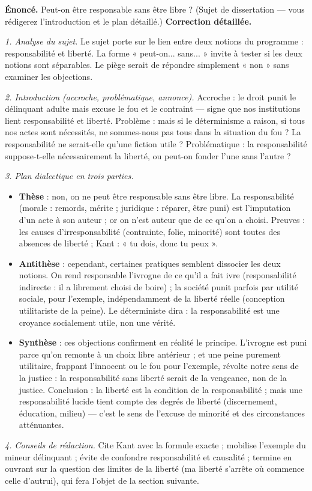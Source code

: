 \documentclass[11pt]{article}
\newcommand{\cle}[1]{{\popxbold\color{popdark}#1}}
\begin{document}
\begin{exoresolu}
\textbf{Énoncé.} Peut-on être responsable sans être libre ? (Sujet de dissertation — vous rédigerez l'introduction et le plan détaillé.)
\tcblower
\textbf{Correction détaillée.}

\emph{1. Analyse du sujet.} Le sujet porte sur le lien entre deux notions du programme : \cle{responsabilité} et \cle{liberté}. La forme « peut-on... sans... » invite à tester si les deux notions sont séparables. Le piège serait de répondre simplement « non » sans examiner les objections.

\emph{2. Introduction (accroche, problématique, annonce).} Accroche : le droit punit le délinquant adulte mais excuse le fou et le contraint — signe que nos institutions lient responsabilité et liberté. Problème : mais si le déterminisme a raison, si tous nos actes sont nécessités, ne sommes-nous pas tous dans la situation du fou ? La responsabilité ne serait-elle qu'une fiction utile ? Problématique : la responsabilité suppose-t-elle nécessairement la liberté, ou peut-on fonder l'une sans l'autre ?

\emph{3. Plan dialectique en trois parties.}
\begin{itemize}
\item \textbf{Thèse} : non, on ne peut être responsable sans être libre. La responsabilité (morale : remords, mérite ; juridique : réparer, être puni) est l'imputation d'un acte à son auteur ; or on n'est auteur que de ce qu'on a choisi. Preuves : les causes d'irresponsabilité (contrainte, folie, minorité) sont toutes des absences de liberté ; Kant : « tu dois, donc tu peux ».
\item \textbf{Antithèse} : cependant, certaines pratiques semblent dissocier les deux notions. On rend responsable l'ivrogne de ce qu'il a fait ivre (responsabilité indirecte : il a librement choisi de boire) ; la société punit parfois par utilité sociale, pour l'exemple, indépendamment de la liberté réelle (conception utilitariste de la peine). Le déterministe dira : la responsabilité est une croyance socialement utile, non une vérité.
\item \textbf{Synthèse} : ces objections confirment en réalité le principe. L'ivrogne est puni parce qu'on remonte à un choix libre antérieur ; et une peine purement utilitaire, frappant l'innocent ou le fou pour l'exemple, révolte notre sens de la justice : la responsabilité sans liberté serait de la vengeance, non de la justice. Conclusion : la liberté est la condition de la responsabilité ; mais une responsabilité lucide tient compte des degrés de liberté (discernement, éducation, milieu) — c'est le sens de l'excuse de minorité et des circonstances atténuantes.
\end{itemize}

\emph{4. Conseils de rédaction.} Cite Kant avec la formule exacte ; mobilise l'exemple du mineur délinquant ; évite de confondre responsabilité et causalité ; termine en ouvrant sur la question des limites de la liberté (ma liberté s'arrête où commence celle d'autrui), qui fera l'objet de la section suivante.
\end{exoresolu}
\end{document}
